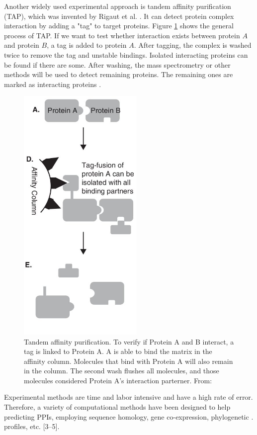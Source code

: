 Another widely used experimental approach is tandem affinity purification (TAP), which was invented by Rigaut et al. \cite{rigaut1999generic}. It can detect protein complex interaction by adding a "tag" to target proteins. Figure \ref{E_M2} shows the general process of TAP. If we want to test whether interaction exists between protein $A$ and protein $B$, a tag is added to protein $A$. After tagging, the complex is washed twice to remove the tag and unstable bindings. Isolated interacting proteins can be found if there are some. After washing, the mass spectrometry or other methods will be used to detect remaining proteins. The remaining ones are marked as interacting proteins \cite{rigaut1999generic}.
\begin{figure}[h!]
\begin{center}
\includegraphics[height =9 cm, width = 6cm]{img/E_M2.jpeg}
\caption[Tandem affinity purification]{Tandem affinity purification. To verify if Protein A and B interact, a tag is linked to Protein A. A is able to bind the matrix in the affinity column. Molecules that bind with Protein A will also remain in the column. The second wash flushes all molecules, and those molecules considered Protein A's interaction parterner. From: \cite{jessulat2011recent} \label{E_M2}}
\end{center}
\end{figure}

Experimental methods are time and labor intensive and have a high rate of error. Therefore, a variety of computational methods have been designed to help predicting PPIs, employing sequence homology, gene co-expression, phylogenetic \cite{shoemaker2007deciphering, liu2012proteome, zahiri2013computational}.
profiles, etc. [3–5].


